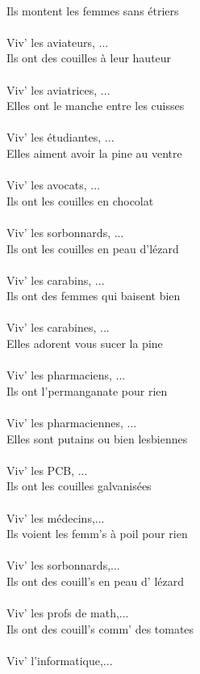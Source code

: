 \\Ils montent les femmes sans étriers
\\\\Viv' les aviateurs, ...
\\Ils ont des couilles à leur hauteur
\\\\Viv' les aviatrices, ...
\\Elles ont le manche entre les cuisses
\\\\Viv' les étudiantes, ...
\\Elles aiment avoir la pine au ventre
\\\\Viv' les avocats, ...
\\Ils ont les couilles en chocolat
\\\\Viv' les sorbonnards, ...
\\Ils ont les couilles en peau d'lézard
\\\\Viv' les carabins, ...
\\Ils ont des femmes qui baisent bien
\\\\Viv' les carabines, ...
\\Elles adorent vous sucer la pine
\\\\Viv' les pharmaciens, ...
\\Ils ont l'permanganate pour rien
\\\\Viv' les pharmaciennes, ...
\\Elles sont putains ou bien lesbiennes
\\\\Viv' les PCB, ...
\\Ils ont les couilles galvanisées
\\\\Viv' les médecins,...
\\Ils voient les femm's à poil pour rien
\\\\Viv' les sorbonnards,...
\\Ils ont des couill's en peau d' lézard
\\\\Viv' les profs de math,...
\\Ils ont des couill's comm' des tomates
\\\\Viv' l'informatique,...
